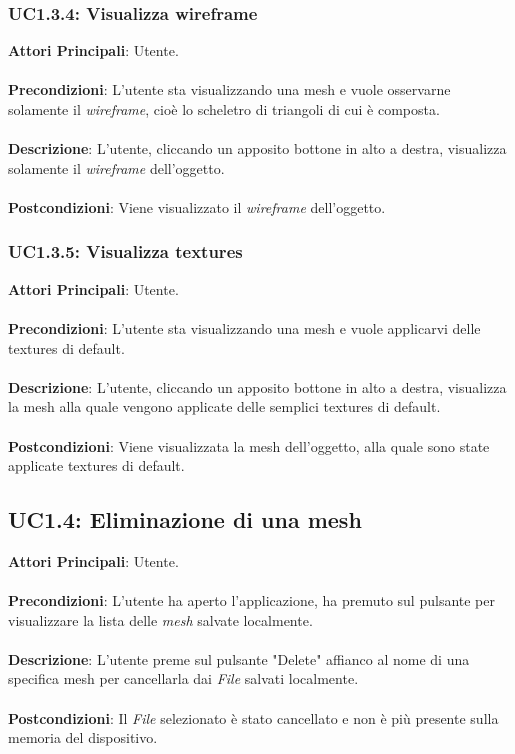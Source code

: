 \subsubsection{UC1.3.4: Visualizza wireframe}
\textbf{Attori Principali}: Utente.
\\\\ \textbf{Precondizioni}: L'utente sta visualizzando una mesh e vuole osservarne solamente il \emph{wireframe}, cioè lo scheletro di triangoli di cui è composta.
\\\\ \textbf{Descrizione}: L'utente, cliccando un apposito bottone in alto a destra, visualizza solamente il \emph{wireframe} dell'oggetto.
\\\\ \textbf{Postcondizioni}: Viene visualizzato il \emph{wireframe} dell'oggetto.

\subsubsection{UC1.3.5: Visualizza textures}
\textbf{Attori Principali}: Utente.
\\\\ \textbf{Precondizioni}: L'utente sta visualizzando una mesh e vuole applicarvi delle textures di default.
\\\\ \textbf{Descrizione}: L'utente, cliccando un apposito bottone in alto a destra, visualizza la mesh alla quale vengono applicate delle semplici textures di default.
\\\\ \textbf{Postcondizioni}: Viene visualizzata la mesh dell'oggetto, alla quale sono state applicate textures di default.

\subsection{UC1.4: Eliminazione di una mesh}
\textbf{Attori Principali}: Utente.
\\\\ \textbf{Precondizioni}: L'utente ha aperto l'applicazione, ha premuto sul pulsante per visualizzare la lista delle \emph{mesh} salvate localmente.
\\\\ \textbf{Descrizione}: L'utente preme sul pulsante "Delete" affianco al nome di una specifica mesh per cancellarla dai \emph{File} salvati localmente.
\\\\ \textbf{Postcondizioni}: Il \emph{File} selezionato è stato cancellato e non è più presente sulla memoria del dispositivo.

